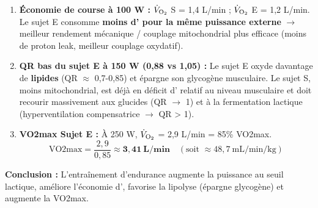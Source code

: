 \documentclass[11pt]{article}
\begin{document}
\begin{exoresolu}
\begin{enumerate}
              L'entraîné repousse le seuil à une puissance bien supérieure (gain \~80\%).
        \item \textbf{Économie de course à 100 W :} $\dot{V}_{\ce{O2}}$ S = 1,4 L/min ; $\dot{V}_{\ce{O2}}$ E = 1,2 L/min. Le sujet E consomme \textbf{moins d' pour la même puissance externe} $\to$ meilleur rendement mécanique / couplage mitochondrial plus efficace (moins de proton leak, meilleur couplage oxydatif).
        \item \textbf{QR bas du sujet E à 150 W (0,88 vs 1,05) :} Le sujet E oxyde davantage de \textbf{lipides} (QR $\approx$ 0,7-0,85) et épargne son glycogène musculaire. Le sujet S, moins mitochondrial, est déjà en déficit d' relatif au niveau musculaire et doit recourir massivement aux glucides (QR $\to$ 1) et à la fermentation lactique (hyperventilation compensatrice $\to$ QR > 1).
        \item \textbf{VO2max Sujet E :} À 250 W, $\dot{V}_{\ce{O2}}$ = 2,9 L/min = 85\% VO2max.
              \[ \text{VO2max} = \frac{2,9}{0,85} \approx \mathbf{3,41\ L/min} \quad (\text{soit } \approx 48,7\ \text{mL/min/kg}) \]
    \end{enumerate}
    \textbf{Conclusion :} L'entraînement d'endurance augmente la puissance au seuil lactique, améliore l'économie d', favorise la lipolyse (épargne glycogène) et augmente la VO2max.
\end{exoresolu}
\end{document}
